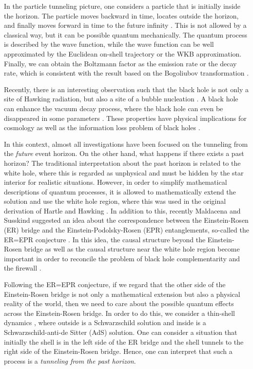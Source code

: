 \documentclass[preprintnumbers,10pt,nofootinbib]{revtex4}
\begin{document}
In the particle tunneling picture, one considers a particle that is initially inside the horizon. The particle moves backward in time, locates outside the horizon, and finally moves forward in time to the future infinity \cite{Hartle:1976tp}. This is not allowed by a classical way, but it can be possible quantum mechanically. The quantum process is described by the wave function, while the wave function can be well approximated by the Euclidean on-shell trajectory or the WKB approximation. Finally, we can obtain the Boltzmann factor as the emission rate or the decay rate, which is consistent with the result based on the Bogoliubov transformation \cite{Hawking:1974sw}.

Recently, there is an interesting observation such that the black hole is not only a site of Hawking radiation, but also a site of a bubble nucleation \cite{Gregory:2013hja}. A black hole can enhance the vacuum decay process, where the black hole can even be disappeared in some parameters \cite{Chen:2017suz}. These properties have physical implications for cosmology \cite{Farhi:1989yr} as well as the information loss problem of black holes \cite{Chen:2014jwq,Sasaki:2014spa}.

In this context, almost all investigations have been focused on the tunneling from the \textit{future} event horizon. On the other hand, what happens if there exists a past horizon? The traditional interpretation about the past horizon is related to the white hole, where this is regarded as unphysical and must be hidden by the star interior for realistic situations. However, in order to simplify mathematical descriptions of quantum processes, it is allowed to mathematically extend the solution and use the white hole region, where this was used in the original derivation of Hartle and Hawking \cite{Hartle:1976tp}. In addition to this, recently Maldacena and Susskind suggested an idea about the correspondence between the Einstein-Rosen (ER) bridge and the Einstein-Podolsky-Rosen (EPR) entanglements, so-called the ER=EPR conjecture \cite{Maldacena:2013xja}. In this idea, the causal structure beyond the Einstein-Rosen bridge as well as the causal structure near the white hole region become important in order to reconcile the problem of black hole complementarity \cite{Susskind:1993if} and the firewall \cite{Almheiri:2012rt}.

Following the ER=EPR conjecture, if we regard that the other side of the Einstein-Rosen bridge is not only a mathematical extension but also a physical reality of the world, then we need to care about the possible quantum effects across the Einstein-Rosen bridge. In order to do this, we consider a thin-shell dynamics \cite{Israel:1966rt,Chen:2017pkl}, where outside is a Schwarzschild solution and inside is a Schwarzschild-anti-de Sitter (AdS) solution. One can consider a situation that initially the shell is in the left side of the ER bridge and the shell tunnels to the right side of the Einstein-Rosen bridge. Hence, one can interpret that such a process is a \textit{tunneling from the past horizon}.
\end{document}

